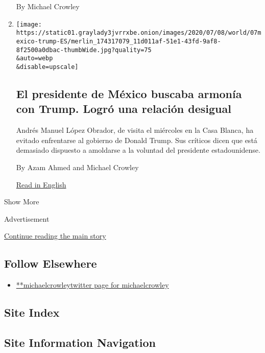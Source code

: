 \begin{enumerate}
  By Michael Crowley
\item
  \href{/es/2020/07/08/espanol/mundo/amlo-trump-washington.html}{}

  \texttt{[image: https://static01.graylady3jvrrxbe.onion/images/2020/07/08/world/07mexico-trump-ES/merlin\_174317079\_11d011af-51e1-43fd-9af8-8f2500a0dbac-thumbWide.jpg?quality=75\\\&auto=webp\\\&disable=upscale]}

  \hypertarget{el-presidente-de-muxe9xico-buscaba-armonuxeda-con-trump-logruxf3-una-relaciuxf3n-desigual}{%
  \subsection{El presidente de México buscaba armonía con Trump. Logró
  una relación
  desigual}\label{el-presidente-de-muxe9xico-buscaba-armonuxeda-con-trump-logruxf3-una-relaciuxf3n-desigual}}

  Andrés Manuel López Obrador, de visita el miércoles en la Casa Blanca,
  ha evitado enfrentarse al gobierno de Donald Trump. Sus críticos dicen
  que está demasiado dispuesto a amoldarse a la voluntad del presidente
  estadounidense.

  By Azam Ahmed and Michael Crowley

  \href{https://www.nytimes3xbfgragh.onion/2020/07/08/world/americas/mexico-amlo-trump-meeting.html}{Read
  in English}
\end{enumerate}

Show More

Advertisement

\protect\hyperlink{after-mid2}{Continue reading the main story}

\hypertarget{follow-elsewhere}{%
\subsection{Follow Elsewhere}\label{follow-elsewhere}}

\begin{itemize}
\tightlist
\item
  \href{https://twitter.com/michaelcrowley}{**michaelcrowleytwitter page
  for michaelcrowley}
\end{itemize}

\hypertarget{site-index}{%
\subsection{Site Index}\label{site-index}}

\hypertarget{site-information-navigation}{%
\subsection{Site Information
Navigation}\label{site-information-navigation}}

